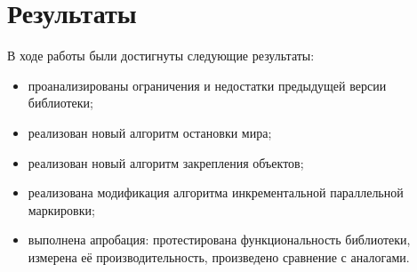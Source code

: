 \section*{Результаты}

В ходе работы были достигнуты следующие результаты:

\begin{itemize}
\item проанализированы ограничения и недостатки предыдущей версии библиотеки;
\item реализован новый алгоритм остановки мира; 
\item реализован новый алгоритм закрепления объектов;
\item реализована модификация алгоритма инкрементальной параллельной маркировки;
\item выполнена апробация: протестирована функциональность библиотеки, измерена её производительность, произведено сравнение с аналогами.
\end{itemize}

